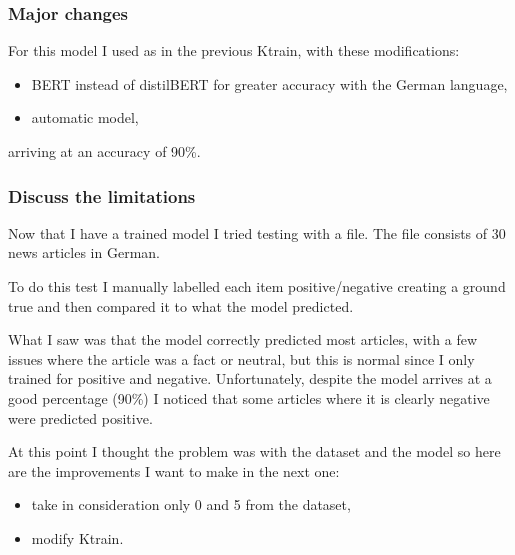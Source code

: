 \subsubsection{Major changes}
For this model I used as in the previous \gls{Ktrain}, with these modifications:
\begin{itemize}
    \item \gls{BERT} instead of distilBERT for greater \gls{accuracy} with the German language,
    \item automatic model,
\end{itemize}
arriving at an \gls{accuracy} of 90\%.

\subsubsection{Discuss the limitations} 
Now that I have a trained model I tried testing with a file. The file consists of 30 news articles in German.

To do this test I manually labelled each item positive/negative creating a ground true and then compared it to what the model predicted.

What I saw was that the model correctly predicted most articles, with a few issues where the article was a fact or neutral, but this is normal since I only trained for positive and negative.
Unfortunately, despite the model arrives at a good percentage (90\%) I noticed that some articles where it is clearly negative were predicted positive. 

At this point I thought the problem was with the dataset and the model so here are the improvements I want to make in the next one:
\begin{itemize}
    \item take in consideration only 0 and 5 from the dataset,
    \item modify \gls{Ktrain}.
\end{itemize}